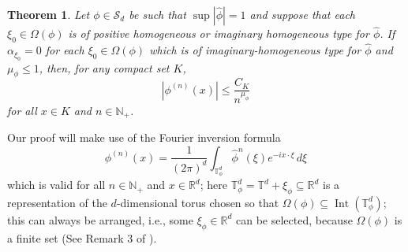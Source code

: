 \documentclass[11pt]{article}
\newtheorem{theorem}{Theorem}[section]
\theoremstyle{remark}
\newcommand\Interior{\operatorname{Int}}
\begin{document}
\begin{theorem}\label{thm:ConvolutionPowerEstimate}
Let $\phi\in\mathcal{S}_d$ be such that $\sup |\widehat{\phi}|=1$ and suppose that each $\xi_0\in\Omega(\phi)$ is of positive homogeneous or imaginary homogeneous type for $\widehat{\phi}$. If $\alpha_{\xi_0}=0$ for each $\xi_0\in\Omega(\phi)$ which is of imaginary-homogeneous type for $\widehat{\phi}$ and $\mu_{\phi}\leq 1$, then, for any compact set $K$, 
\begin{equation*}
    \left|\phi^{(n)}(x)\right|\leq\frac{C_K}{n^{\mu_\phi}}
\end{equation*}
for all $x\in K$ and $n\in\mathbb{N}_+$.
\end{theorem}
\noindent Our proof will make use of the Fourier inversion formula
\begin{equation}\label{eq:FourierInversionConvolutionPower}
\phi^{(n)}(x)=\frac{1}{(2\pi)^d}\int_{\mathbb{T}_\phi^d}\widehat{\phi}^n(\xi)e^{-ix\cdot\xi}\,d\xi
\end{equation}
which is valid for all $n\in\mathbb{N}_+$ and $x\in\mathbb{R}^d$; here $\mathbb{T}_\phi^d=\mathbb{T}^d+\xi_\phi\subseteq\mathbb{R}^d$
is a representation of the $d$-dimensional torus chosen so that $\Omega(\phi)\subseteq \Interior(\mathbb{T}_{\phi}^d)$; this can always be arranged, i.e., some $\xi_\phi\in\mathbb{R}^d$ can be selected, because $\Omega(\phi)$ is a finite set (See Remark 3 of \cite{Randles2017}).
\end{document}
